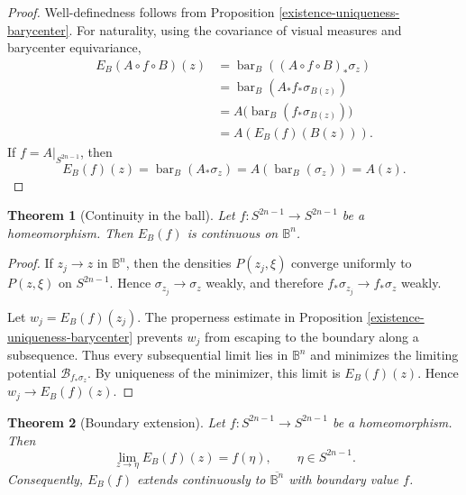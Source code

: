 \documentclass[11pt]{article}
\newtheorem{theorem}{Theorem}[section]
\theoremstyle{definition}
\theoremstyle{remark}
\theoremstyle{definition}
\newcommand{\B}{\mathbb B}
\newcommand{\barB}{\operatorname{bar}_{B}}
\begin{document}
\begin{proof}
Well-definedness follows from Proposition \ref{existence-uniqueness-barycenter}.
For naturality, using the covariance of visual measures and barycenter
equivariance,
\[
\begin{aligned}
        E_B(A\circ f\circ B)(z)
        &=\barB((A\circ f\circ B)_*\sigma_z)\\
        &=\barB(A_*f_*\sigma_{B(z)})\\
        &=A\bigl(\barB(f_*\sigma_{B(z)})\bigr)\\
        &=A(E_B(f)(B(z))).
\end{aligned}
\]
If \(f=A|_{S^{2n-1}}\), then
\[
        E_B(f)(z)=\barB(A_*\sigma_z)=A(\barB(\sigma_z))=A(z).
\]
\end{proof}

\begin{theorem}[Continuity in the ball]\label{interior-continuity}
Let \(f:S^{2n-1}\to S^{2n-1}\) be a homeomorphism.  Then \(E_B(f)\) is
continuous on \(\B^n\).
\end{theorem}

\begin{proof}
If \(z_j\to z\) in \(\B^n\), then the densities \(P(z_j,\xi)\) converge
uniformly to \(P(z,\xi)\) on \(S^{2n-1}\).  Hence \(\sigma_{z_j}\to\sigma_z\)
weakly, and therefore \(f_*\sigma_{z_j}\to f_*\sigma_z\) weakly.

Let \(w_j=E_B(f)(z_j)\).  The properness estimate in Proposition
\ref{existence-uniqueness-barycenter} prevents \(w_j\) from escaping to the
boundary along a subsequence.  Thus every subsequential limit lies in \(\B^n\)
and minimizes the limiting potential \(\mathcal B_{f_*\sigma_z}\).  By
uniqueness of the minimizer, this limit is \(E_B(f)(z)\).  Hence
\(w_j\to E_B(f)(z)\).
\end{proof}

\begin{theorem}[Boundary extension]\label{boundary-extension}
Let \(f:S^{2n-1}\to S^{2n-1}\) be a homeomorphism. Then
\[
        \lim_{z\to\eta}E_B(f)(z)=f(\eta),
        \qquad \eta\in S^{2n-1}.
\]
Consequently, \(E_B(f)\) extends continuously to
\(\overline{\B^n}\) with boundary value \(f\).
\end{theorem}
\end{document}
